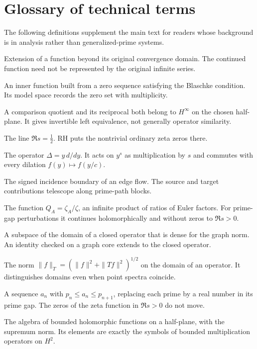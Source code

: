 \documentclass[12pt,letterpaper]{article}
\theoremstyle{remark}
\numberwithin{equation}{section}
\begin{document}
\section{Glossary of technical terms}
The following definitions supplement the main text for readers
whose background is in analysis rather than generalized-prime systems.
\begin{description}[style=nextline,leftmargin=1.5em]
\item[Analytic continuation] Extension of a function beyond its original convergence domain. The continued function need not be represented by the original infinite series.
\item[Blaschke product] An inner function built from a zero sequence satisfying the Blaschke condition. Its model space records the zero set with multiplicity.
\item[Bounded diagonal comparison] A comparison quotient and its reciprocal both belong to $H^\infty$ on the chosen half-plane. It gives invertible left equivalence, not generally operator similarity.
\item[Critical line] The line $\Re s=\tfrac{1}{2}$. RH puts the nontrivial ordinary zeta zeros there.
\item[Dilation generator] The operator $\Delta=y\,d/dy$. It acts on $y^s$ as multiplication by $s$ and commutes with every dilation $f(y)\mapsto f(y/c)$.
\item[Discrete divergence] The signed incidence boundary of an edge flow. The source and target contributions telescope along prime-path blocks.
\item[Euler quotient] The function $Q_A=\zeta_A/\zeta$, an infinite product of ratios of Euler factors. For prime-gap perturbations it continues holomorphically and without zeros to $\Re s>0$.
\item[Graph core] A subspace of the domain of a closed operator that is dense for the graph norm. An identity checked on a graph core extends to the closed operator.
\item[Graph norm] The norm $\|f\|_T=(\|f\|^2+\|Tf\|^2)^{1/2}$ on the domain of an operator. It distinguishes domains even when point spectra coincide.
\item[Grosswald--Schnitzer perturbation] A sequence $a_n$ with $p_n\le a_n\le p_{n+1}$, replacing each prime by a real number in its prime gap. The zeros of the zeta function in $\Re s>0$ do not move.
\item[$H^\infty$] The algebra of bounded holomorphic functions on a half-plane, with the supremum norm. Its elements are exactly the symbols of bounded multiplication operators on $H^2$.

\end{description}
\end{document}
